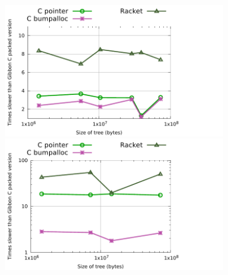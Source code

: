 \documentclass[a4paper,english]{lipics-v2016}
\newcommand{\treelang}{Gibbon\xspace} %
\begin{document}

\begin{figure}[t]
  \hspace{-5mm}
  \begin{minipage}{1.04\textwidth}
    \begin{minipage}{.49\textwidth}
      \centering
      \includegraphics[width=3.8in]{./figs/slowdown_countnodes.pdf}
    \end{minipage}
    \begin{minipage}{.49\textwidth}
      \includegraphics[width=3.8in]{./figs/slowdown_treewalk.pdf}
    \end{minipage}
  \end{minipage}
  \caption{}
  \label{fig:slowdown}
\end{figure}
      
\end{document}
